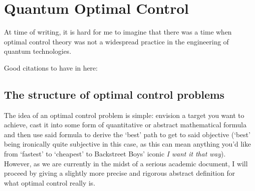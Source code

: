 \chapter{Quantum Optimal Control}\label{chap:3_Quantum_Optimal_control}

At time of writing, it is hard for me to imagine that there was a time when optimal control theory was not a widespread practice in the engineering of quantum technologies. 



Good citations to have in here: \cite{schirmer_complete_2001, koch_quantum_2022,glaser_training_2015}


\section{The structure of optimal control problems}\label{sec:3.1_structure_quantum_control}

The idea of an optimal control problem is simple: envision a target you want to achieve, cast it into some form of quantitative or abstract mathematical formula and then use said formula to derive the `best' path to get to said objective (`best' being ironically quite subjective in this case, as this can mean anything you'd like from `fastest' to `cheapest' to Backstreet Boys' iconic \emph{I want it that way}\cite{noauthor_backstreet_nodate}). However, as we are currently in the midst of a serious academic document, I will proceed by giving a slightly more precise and rigorous abstract definition for what optimal control really is.

